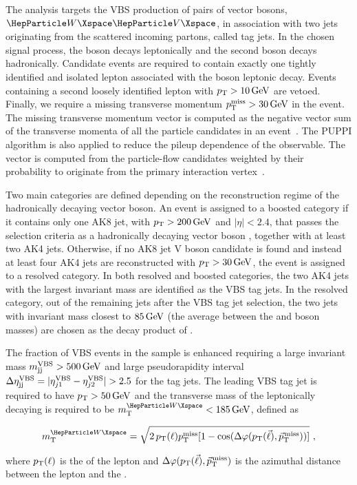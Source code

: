 The analysis targets the VBS production of pairs of vector bosons, $\PW\PV$, in association with two jets originating
from the scattered incoming partons, called tag jets.  In the chosen signal process, the {\PW} boson decays leptonically
and the second boson decays hadronically.  Candidate events are required to contain exactly one tightly identified and
isolated lepton \cite{Khachatryan:2015hwa,Chatrchyan:2012xi} associated with the {\PW} boson leptonic decay. Events
containing a second loosely identified lepton with $p_{\mathrm{T}} > 10\,\text{Ge\hspace{-.08em}V}$ are vetoed.  Finally, we require a missing transverse
momentum $p_{\mathrm{T}}^\text{miss} > 30\,\text{Ge\hspace{-.08em}V}$ in the event.  The missing transverse momentum vector \ptvecmiss is computed as the negative
vector sum of the transverse momenta of all the particle candidates in an event~\cite{Sirunyan:2019kia}.  The PUPPI
algorithm is also applied to reduce the pileup dependence of the \ptmiss observable. The \ptmiss vector is computed from
the particle-flow candidates weighted by their probability to originate from the primary interaction
vertex~\cite{Sirunyan:2019kia}.

Two main categories are defined depending on the reconstruction regime of the hadronically decaying vector boson.  An
event is assigned to a boosted category if it contains only one AK8 jet, with $p_{\mathrm{T}} > 200\,\text{Ge\hspace{-.08em}V}$ and $|\eta|<2.4$, that
passes the selection criteria as a hadronically decaying vector boson \vhad, together with at least two AK4
jets. Otherwise, if no AK8 jet V boson candidate is found and instead at least four AK4 jets are reconstructed with $p_{\mathrm{T}}
> 30\,\text{Ge\hspace{-.08em}V}$, the event is assigned to a resolved category.  In both resolved and boosted categories, the two AK4 jets with
the largest invariant mass are identified as the VBS tag jets.  In the resolved category, out of the remaining jets
after the VBS tag jet selection, the two jets with invariant mass closest to $85\,\text{Ge\hspace{-.08em}V}$ (the average between the {\PW} and
{\PZ} boson masses) are chosen as the decay product of \vhad.

The fraction of VBS events in the sample is enhanced requiring a large invariant mass $m_{\mathrm{jj}}^{\mathrm{VBS}} > 500\,\text{Ge\hspace{-.08em}V}$ and large
pseudorapidity interval $\Delta \eta_{\mathrm{jj}}^{\mathrm{VBS}}= | \eta_{j1}^{\text{VBS}} - \eta_{j2}^{\text{VBS}}| > 2.5$ for the tag jets.  The
leading VBS tag jet is required to have $p_{\mathrm{T}} > 50\,\text{Ge\hspace{-.08em}V}$ and the transverse mass of the leptonically decaying {\PW} is
required to be $\mtw < 185\GeV$, defined as
\begin{linenomath}
\begin{equation}
\mtw = \sqrt{2\,\pt(\ell) \ptmiss [ 1 - \cos (\Delta\varphi (\pt(\vec{\ell}), \ptvecmiss))]}~,
\end{equation}
\end{linenomath}
where $p_{\mathrm{T}}(\ell)$ is the \pt of the lepton and $\Delta\varphi (p_{\mathrm{T}}(\vec{\ell}), {\vec p}_{\mathrm{T}}^{\kern1pt\text{miss}})$ is the azimuthal distance
between the lepton and the \ptvecmiss.

